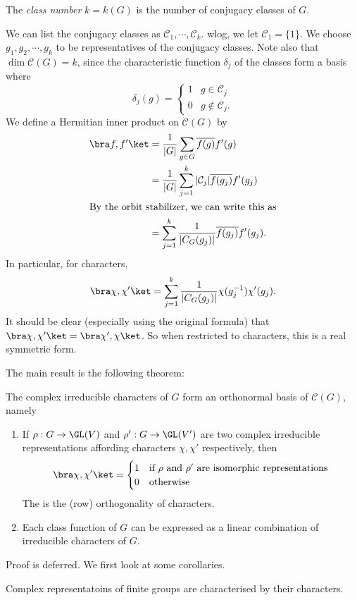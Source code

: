 \documentclass[a4paper]{article}
\begin{document}
\begin{defi}
  The \emph{class number} $k = k(G)$ is the number of conjugacy classes of $G$.
\end{defi}
We can list the conjugacy classes as $\mathcal{C}_1, \cdots, \mathcal{C}_k$. wlog, we let $\mathcal{C}_1 = \{1\}$. We choose $g_1, g_2, \cdots, g_k$ to be representatives of the conjugacy classes. Note also that $\dim \mathcal{C}(G) = k$, since the characteristic function $\delta_j$ of the classes form a basis where
\[
  \delta_j(g) =
  \begin{cases}
    1 & g \in \mathcal{C}_j\\
    0 & g \not\in \mathcal{C}_j.
  \end{cases}
\]
We define a Hermitian inner product on $\mathcal{C}(G)$ by
\begin{align*}
  \bra f, f'\ket &= \frac{1}{|G|} \sum_{g \in G}\overline{f(g)} f'(g) \\
  &= \frac{1}{|G|} \sum_{j = 1}^k |\mathcal{C}_j|\overline{f(g_j)} f'(g_j)\\
  \intertext{By the orbit stabilizer, we can write this as}
  &= \sum_{j = 1}^k \frac{1}{|C_G(g_j)|} \overline{f(g_j)} f'(g_j).
\end{align*}
In particular, for characters,
\[
  \bra \chi, \chi'\ket = \sum_{j = 1}^k \frac{1}{|C_G(g_j)|} \chi(g_j^{-1}) \chi'(g_j).
\]
It should be clear (especially using the original formula) that $\bra \chi, \chi'\ket = \bra \chi', \chi\ket$. So when restricted to characters, this is a real symmetric form.

The main result is the following theorem:
\begin{thm}
  The complex irreducible characters of $G$ form an orthonormal basis of $\mathcal{C}(G)$, namely
  \begin{enumerate}
    \item If $\rho: G \to \GL(V)$ and $\rho': G \to \GL(V')$ are two complex irreducible representations affording characters $\chi, \chi'$ respectively, then
      \[
        \bra \chi, \chi'\ket =
        \begin{cases}
          1 & \text{if $\rho$ and $\rho'$ are isomorphic representations}\\
          0 & \text{otherwise}
        \end{cases}
      \]
      The is the (row) orthogonality of characters.
    \item Each class function of $G$ can be expressed as a linear combination of irreducible characters of $G$.
  \end{enumerate}
\end{thm}
Proof is deferred. We first look at some corollaries.
\begin{cor}
  Complex representatoins of finite groups are characterised by their characters.
\end{cor}
\end{document}
